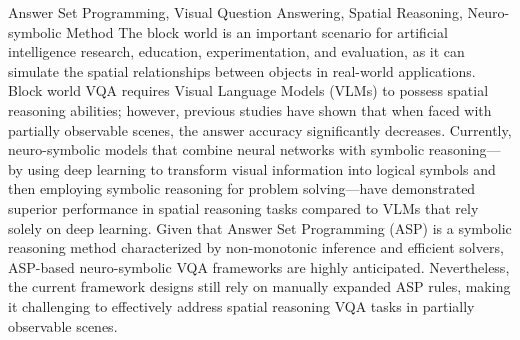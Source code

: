 \begin{englishabstract}{Answer Set Programming, Visual Question Answering, Spatial Reasoning, Neuro-symbolic Method}
The block world is an important scenario for artificial intelligence research, education, experimentation, and evaluation, as it can simulate the spatial relationships between objects in real-world applications. Block world VQA requires Visual Language Models (VLMs) to possess spatial reasoning abilities; however, previous studies have shown that when faced with partially observable scenes, the answer accuracy significantly decreases. Currently, neuro-symbolic models that combine neural networks with symbolic reasoning—by using deep learning to transform visual information into logical symbols and then employing symbolic reasoning for problem solving—have demonstrated superior performance in spatial reasoning tasks compared to VLMs that rely solely on deep learning. Given that Answer Set Programming (ASP) is a symbolic reasoning method characterized by non-monotonic inference and efficient solvers, ASP-based neuro-symbolic VQA frameworks are highly anticipated. Nevertheless, the current framework designs still rely on manually expanded ASP rules, making it challenging to effectively address spatial reasoning VQA tasks in partially observable scenes.


\end{englishabstract}
